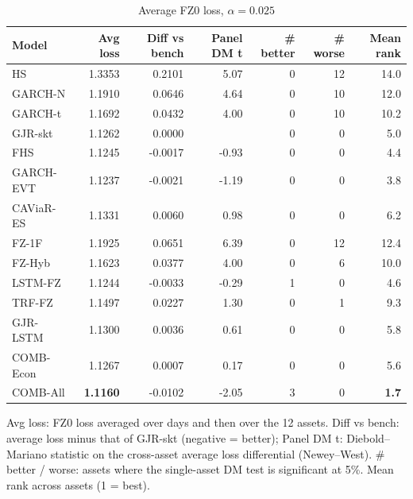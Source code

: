 \begin{table}[htbp]
\centering
\footnotesize
\caption{Average FZ0 loss, $\alpha=0.025$}
\label{tab:loss_a025}
\begin{tabular}{lrrrrrr}
\toprule
Model & Avg loss & Diff vs bench & Panel DM t & \# better & \# worse & Mean rank \\
\midrule
HS & 1.3353 & 0.2101 & 5.07 & 0 & 12 & 14.0 \\
GARCH-N & 1.1910 & 0.0646 & 4.64 & 0 & 10 & 12.0 \\
GARCH-t & 1.1692 & 0.0432 & 4.00 & 0 & 10 & 10.2 \\
GJR-skt & 1.1262 & 0.0000 &  & 0 & 0 & 5.0 \\
FHS & 1.1245 & -0.0017 & -0.93 & 0 & 0 & 4.4 \\
GARCH-EVT & 1.1237 & -0.0021 & -1.19 & 0 & 0 & 3.8 \\
CAViaR-ES & 1.1331 & 0.0060 & 0.98 & 0 & 0 & 6.2 \\
FZ-1F & 1.1925 & 0.0651 & 6.39 & 0 & 12 & 12.4 \\
FZ-Hyb & 1.1623 & 0.0377 & 4.00 & 0 & 6 & 10.0 \\
LSTM-FZ & 1.1244 & -0.0033 & -0.29 & 1 & 0 & 4.6 \\
TRF-FZ & 1.1497 & 0.0227 & 1.30 & 0 & 1 & 9.3 \\
GJR-LSTM & 1.1300 & 0.0036 & 0.61 & 0 & 0 & 5.8 \\
COMB-Econ & 1.1267 & 0.0007 & 0.17 & 0 & 0 & 5.6 \\
COMB-All & \textbf{1.1160} & -0.0102 & -2.05 & 3 & 0 & \textbf{1.7} \\
\bottomrule
\end{tabular}
\par\smallskip\parbox{\linewidth}{\scriptsize Avg loss: FZ0 loss averaged over days and then over the 12 assets. Diff vs bench: average loss minus that of GJR-skt (negative = better); Panel DM t: Diebold--Mariano statistic on the cross-asset average loss differential (Newey--West). \# better / worse: assets where the single-asset DM test is significant at 5\%. Mean rank across assets (1 = best).}
\end{table}